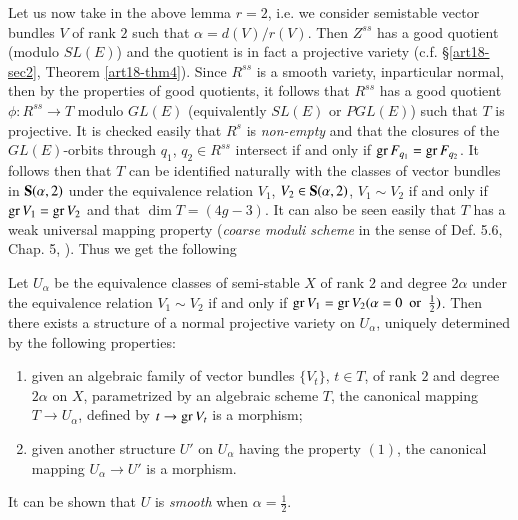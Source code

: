 Let us now take in the above lemma $r=2$, i.e. we consider semi\-stable vector bundles $V$ of rank $2$ such that $\alpha=d(V)/r(V)$. Then $Z^{ss}$ has a good quotient (modulo $SL(E)$) and the quotient is in fact a projective variety (c.f. \S\ref{art18-sec2}, Theorem \ref{art18-thm4}). Since $R^{ss}$ is a smooth variety, in\pageoriginale particular normal, then by the properties of good quotients, it follows that $R^{ss}$ has a good quotient $\phi:R^{ss}\to T$ modulo $GL(E)$ (equivalently $SL(E)$ or $PGL(E)$) such that $T$ is projective. It is checked easily that $R^{s}$ is {\em non-empty} and that the closures of the $GL(E)$-orbits through $q_{1}$, $q_{2}\in R^{ss}$ intersect if and only if $\operatorname{\mathrm{gr}} F_{q_{1}}=\operatorname{\mathrm{gr}} F_{q_{2}}$. It follows then that $T$ can be identified naturally with the classes of vector bundles in $\mathbf{S}(\alpha,2)$ under the equivalence relation $V_{1}$, $V_{2}\in \mathbf{S}(\alpha,2)$, $V_{1}\sim V_{2}$ if and only if $\operatorname{\mathrm{gr}} V_{1}=\operatorname{\mathrm{gr}} V_{2}$ and that $\dim T=(4g-3)$. It can also be seen easily that $T$ has a weak universal mapping property ({\em coarse moduli scheme} in the sense of Def. 5.6, Chap. 5, \cite{art18-key4}). Thus we get the following

\begin{theorem}\label{art18-thm5}
Let $U_{\alpha}$ be the equivalence classes of semi-stable $X$ of rank $2$ and degree $2\alpha$ under the equivalence relation $V_{1}\sim V_{2}$ if and only if $\operatorname{\mathrm{gr}} V_{1}=\operatorname{\mathrm{gr}} V_{2}(\alpha=0\text{~ or~ }\frac{1}{2})$. Then there exists a structure of a normal projective variety on $U_{\alpha}$, uniquely determined by the following properties:
\begin{enumerate}
\renewcommand{\labelenumi}{\rm(\theenumi)}
\item given an algebraic family of vector bundles $\{V_{t}\}$, $t\in T$, of rank $2$ and degree $2\alpha$ on $X$, parametrized by an algebraic scheme $T$, the canonical mapping $T\to U_{\alpha}$, defined by $t\to \operatorname{\mathrm{gr}} V_{t}$ is a morphism;

\item given another structure $U'$ on $U_{\alpha}$ having the property $(1)$, the canonical mapping $U_{\alpha}\to U'$ is a morphism.
\end{enumerate}
\end{theorem}

\begin{remark*}
It can be shown that $U$ is {\em smooth} when $\alpha=\frac{1}{2}$.
\end{remark*}

